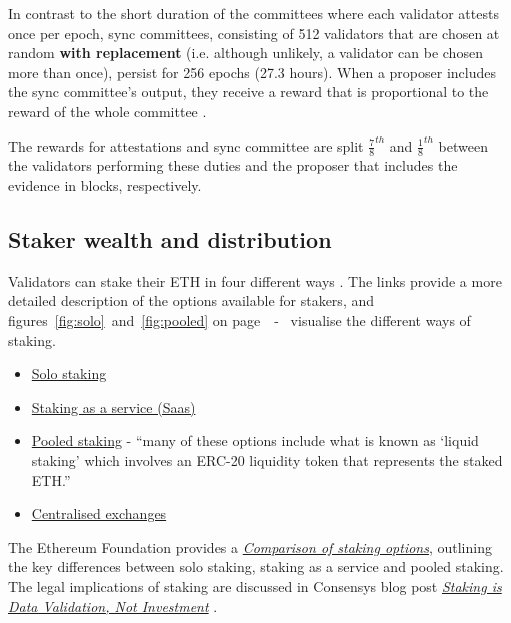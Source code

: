 \documentclass[UTF8]{article}
\begin{document}
In contrast to the short duration of the committees where each validator attests once per epoch, sync committees, consisting of 512 validators that are chosen at random \textbf {with replacement} (i.e. although unlikely, a validator can be chosen more than once), persist for 256 epochs (27.3 hours).  When a proposer includes the sync committee's output, they receive a reward that is proportional to the reward of the whole committee \cite{Edgington2023}.

The rewards for attestations and sync committee are split $\frac{7}{8}^{th}$ and $\frac{1}{8}^{th}$ between the validators performing these duties and the proposer that includes the evidence in blocks, respectively.

\subsection{Staker wealth and distribution}
Validators can stake their ETH in four different ways \cite{breslina}. The links provide a more detailed description of the options available for stakers, and figures~\ref{fig:solo}~and~\ref{fig:pooled} on page~\pageref{fig:solo}~-~\pageref{fig:pooled} visualise the different ways of staking.

\begin{itemize}
\item \href{https://ethereum.org/en/staking/solo/}{Solo staking} \cite{efsolo}
\item \href{https://ethereum.org/en/staking/saas/}{Staking as a service (Saas)} \cite{efsaas}
\item \href{https://ethereum.org/en/staking/pools/}{Pooled staking} - ``many of these options include what is known as `liquid staking' which involves an ERC-20 liquidity token that represents the staked ETH.'' \cite{efpools} 
\item \href{https://ethereum.org/en/staking/}{Centralised exchanges} \cite{efstaking}
\end{itemize}

The Ethereum Foundation provides a \href{https://ethereum.org/en/staking/#comparison-of-options}{\textit{Comparison of staking options}}, outlining the key differences between solo staking, staking as a service and pooled staking. The legal implications of staking are discussed in Consensys blog post \href{https://consensys.net/blog/news/staking-is-data-validation-not-investment/}{\textit{Staking is Data Validation, Not Investment}} \cite{corva2023}.
\end{document}

